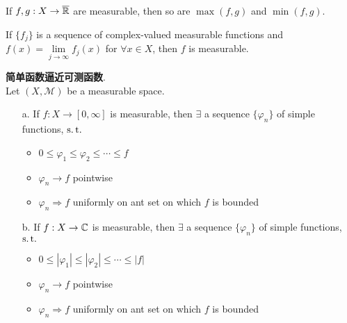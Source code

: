 	\vspace*{6em}
	
	\begin{corollary}\label{cor 3.1.3}
		If $f , g : X \rightarrow \overline{\mathbb{R}}$ are measurable, then so are $\max{(f , g)}$ and $\min{(f , g)}$.
	\end{corollary}
	
	\begin{corollary}\label{cor 3.1.4}
		If $\{ f_j \}$ is a sequence of complex-valued measurable functions and $f(x) = \underset{j \to \infty}{\lim}{f_{j}(x)}$ for $\forall x \in X$, then $f$ is measurable.
	\end{corollary}
	
	\newpage
	
	\begin{thm}\label{thm 3.1.5}
		\textbf{简单函数逼近可测函数}. \\
		Let $(X , \mathcal{M})$ be a measurable space.
		\begin{enumerate}
			\item[a.] If $f : X \rightarrow [0 , \infty]$ is measurable, then $\exists$ a sequence $\{ \varphi_n \}$ of simple functions, $\operatorname{s.t.}$
			\begin{itemize}
				\item $0 \leq \varphi_1 \leq \varphi_2 \leq \cdots \leq f$
				
				\item $\varphi_n \to f$ pointwise
				
				\item $\varphi_n \Rightarrow f$ uniformly on ant set on which $f$ is bounded
			\end{itemize}
			
			\vspace*{3em}
			
			\item[b.] If $f : X \rightarrow \mathbb{C}$ is measurable, then $\exists$ a sequence $\{ \varphi_n \}$ of simple functions, $\operatorname{s.t.}$
			\begin{itemize}
				\item $0 \leq \left| \varphi_1 \right| \leq \left| \varphi_2 \right| \leq \cdots \leq \left| f \right|$
				
				\item $\varphi_n \to f$ pointwise
				
				\item $\varphi_n \Rightarrow f$ uniformly on ant set on which $f$ is bounded
			\end{itemize}
		\end{enumerate}
	\end{thm}
	
